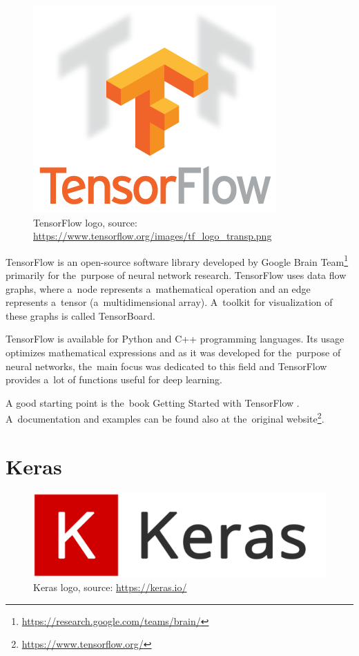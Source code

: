 \begin{figure}[H]
   \centering
	\includegraphics[scale=0.5]{./pictures/tf-logo.png}
	\caption[TensorFlow logo]{TensorFlow logo, source: \url{https://www.tensorflow.org/images/tf_logo_transp.png}}
      \label{fig:tf-logo}
\end{figure}

TensorFlow is an open-source software library developed by Google Brain 
Team\footnote{\url{https://research.google.com/teams/brain/}} primarily for
the~purpose of neural network research. TensorFlow uses data flow graphs, where
a~node represents a~mathematical operation and an edge represents a~tensor
(a~multidimensional array). A~toolkit for visualization of these graphs is called 
TensorBoard.

TensorFlow is available for Python and C++ programming languages. Its usage 
optimizes mathematical expressions and as it was developed for the~purpose of 
neural networks, the~main focus was dedicated to this field and TensorFlow 
provides a~lot of functions useful for deep learning.

A good starting point is the~book Getting Started with TensorFlow \cite{tf}.
A~documentation and examples can be found also at the~original 
website\footnote{\url{https://www.tensorflow.org/}}.

\section{Keras}
\label{keras}

\begin{figure}[H]
   \centering
	\includegraphics[width=\linewidth]{./pictures/keras-logo.png}
	\caption[Keras logo]{Keras logo, source: \url{https://keras.io/}}
      \label{fig:keras-logo}
\end{figure}

